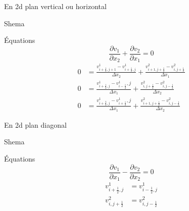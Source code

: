 \begin{frame}{En 2d plan vertical ou horizontal}

\begin{block}{Shema}
\vspace{-1cm}
\end{block}
\vspace{-1cm}
\begin{block}{Équations}
\begin{equation*}
 \frac{\partial v_{1}}{\partial x_{2}}+\frac{\partial v_{2}}{\partial x_{1}}=0
 \end{equation*}
 \begin{align*}
  0&=\frac{v^{1}_{i+\frac{1}{2},j+1}-v^{1}_{i+\frac{1}{2},j}}{\Delta x_{2}}+\frac{v^{2}_{i+1,j+\frac{1}{2}}-v^{2}_{i,j+\frac{1}{2}}}{\Delta x_{1}}\\
  0&=\frac{v^{1}_{i+\frac{1}{2},j}-v^{1}_{i-\frac{1}{2}},j}{\Delta x_{1}}+\frac{v^{2}_{i,j+\frac{1}{2}}-v^{2}_{i,j-\frac{1}{2}}}{\Delta x_2}\\
  0&=\frac{v^{1}_{i+\frac{3}{2},j}-v^{1}_{i+\frac{1}{2}},j}{\Delta x_{1}}+\frac{v^{2}_{i+1,j+\frac{1}{2}}-v^{2}_{i,j-\frac{1}{2}}}{\Delta x_2}
 \end{align*}

\end{block}

\end{frame}

\begin{frame}{En 2d plan diagonal}
 \begin{block}{Shema}
\vspace{-1cm}
\end{block}
\begin{block}{Équations}
 \begin{equation*}
  \frac{\partial v_{1}}{\partial x_{1}}-\frac{\partial v_{2}}{\partial x_{2}}=0
 \end{equation*}
 \begin{align*}
  v^{1}_{i+\frac{1}{2},j}&=v^{1}_{i-\frac{1}{2},j}\\
  v^{2}_{i,j+\frac{1}{2}}&=v^{2}_{i,j-\frac{1}{2}}
 \end{align*}
\end{block}

\end{frame}

